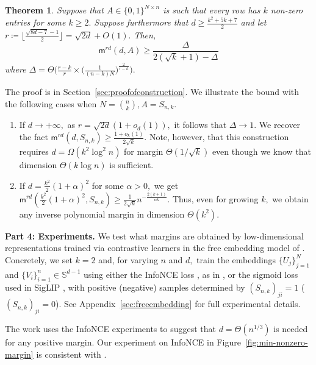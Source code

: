 \documentclass[preprint]{article}
\newtheorem{theorem}{Theorem}[section]
\newcommand{\maxmargin}{\mathsf{m}^{rd}}
\newcommand{\ksparsen}{S_{n,k}}
\begin{document}
\begin{theorem}
\label{thm:main_construction}
Suppose that $A\in \{0,1\}^{N\times n}$ is such that every row has $k$ non-zero entries for some $k\ge 2.$ Suppose furthermore that
$d\ge \frac{k^2 + 5k + 7}{2}$ and let $r\coloneqq\lfloor \frac{\sqrt{8d-7}-1}{2}\rfloor = \sqrt{2d}+O(1).$ Then, 
$$
\maxmargin(d, A)\ge 
\frac{\Delta}{2(\sqrt{k} + 1) - \Delta}
$$    
where $\Delta = \Theta\Big( \frac{r-k}{r}\times \Big(\frac{1}{(n-k)N}\Big)^{\frac{2}{r - k}}\Big).$
\end{theorem}
The proof is in Section~\ref{sec:proofofconstruction}. We illustrate the bound with the following cases when $N = \binom{n}{k}, A = \ksparsen.$
\begin{enumerate}
    \item If $d\longrightarrow +\infty,$ as $r= \sqrt{2d}(1 + o_d(1)),$ it follows that $\Delta\longrightarrow 1.$ We recover the fact $\maxmargin(d, \ksparsen)\ge \frac{1+o_k(1)}{2\sqrt{k}}.$ Note, however, that this construction requires $d = \Omega(k^2\log^2 n)$ for margin $\Theta(1/\sqrt{k})$ even though we know that dimension $\Theta(k\log n)$ is sufficient.
    \item If $d = \frac{k^2}{2}(1+\alpha)^2$ for some $\alpha>0,$ we get 
    $\maxmargin(\frac{k^2}{2}(1 + \alpha)^2, \ksparsen)\ge \frac{1}{2\sqrt{k}}n^{-\frac{2(k+1)}{\alpha k}}.$ Thus, even for growing $k,$ we obtain any inverse polynomial margin in dimension $\Theta(k^2).$
\end{enumerate}




\textbf{Part 4: Experiments.} We test what margins are obtained by low-dimensional representations trained via contrastive learners in the free embedding model of \cite{weller2025theoretical}. Concretely, we set $k = 2$ and, for varying $n$ and $d,$ train the embeddings $\{U_j\}_{j = 1}^N$ and $\{V_i\}_{i = 1}^n\in \mathbb{S}^{d-1}$ using either the InfoNCE loss \cite{oord2018representation}, as in \cite{weller2025theoretical}, or the sigmoid loss used in SigLIP \cite{zhai23siglip}, with positive (negative) samples determined by $(\ksparsen)_{ji} = 1$ ($(\ksparsen)_{ji} = 0$). 
See Appendix~\ref{sec:freeembedding} for full experimental details.

The work \cite{weller2025theoretical} uses the InfoNCE experiments to suggest that $d = \Theta(n^{1/3})$ is needed for any positive margin. Our experiment on InfoNCE in Figure~\ref{fig:min-nonzero-margin} is consistent with \cite[Figure 2]{weller2025theoretical}. 
\end{document}
